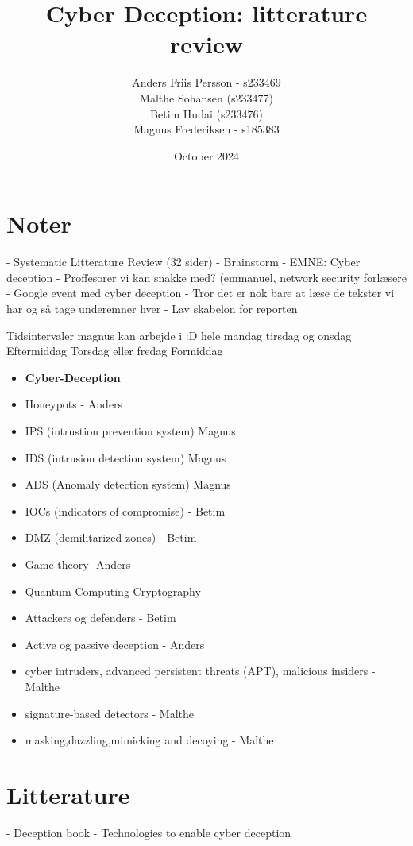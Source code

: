 \documentclass{article}
\title{Cyber Deception: litterature review}
\author{Anders Friis Persson - s233469\\Malthe Sohansen (s233477) \\ Betim Hudai (s233476) \\  Magnus Frederiksen - s185383}
\date{October 2024}
\begin{document}
\maketitle

\section{Noter}
- Systematic Litterature Review (32 sider)
- Brainstorm
- EMNE: Cyber deception
- Proffesorer vi kan snakke med? (emmanuel, network security forlæsere
- Google event med cyber deception 
- Tror det er nok bare at læse de tekster vi har og så tage underemner hver
- Lav skabelon for reporten

Tidsintervaler magnus kan arbejde i :D
hele mandag
tirsdag og onsdag Eftermiddag
Torsdag eller fredag Formiddag

\begin{itemize}
    \item \textbf{Cyber-Deception}
    \item Honeypots - Anders
    \item IPS (intrustion prevention system) Magnus
    \item IDS (intrusion detection system) Magnus
    \item ADS (Anomaly detection system) Magnus
    \item IOCs (indicators of compromise) - Betim
    \item DMZ (demilitarized zones) - Betim
    \item Game theory -Anders
    \item Quantum Computing Cryptography 
    \item Attackers og defenders - Betim 
    \item Active og passive deception - Anders
    \item cyber intruders, advanced persistent threats (APT), malicious insiders - Malthe
    \item signature-based detectors - Malthe
    \item masking,dazzling,mimicking and decoying - Malthe
    
\end{itemize}






\section{Litterature}
- Deception book
- Technologies to enable cyber deception
\end{document}
